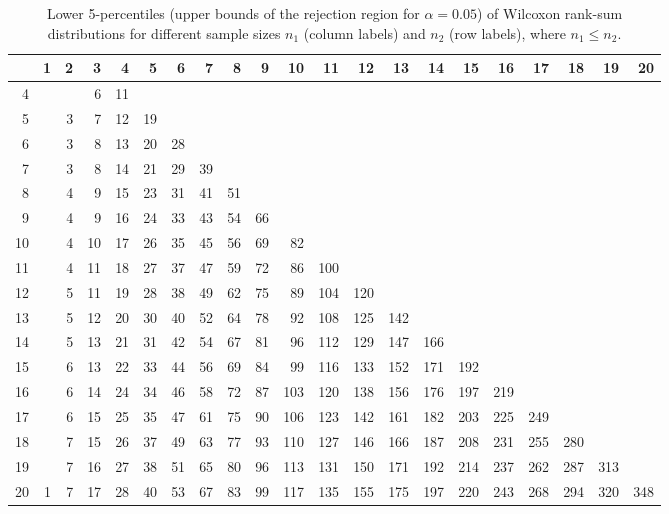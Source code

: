 \begin{table}[ht]
\centering
\begin{tabular}{@{}r@{~~}r@{~~}r@{~~}r@{~~}r@{~~}r@{~~}r@{~~}r@{~~}r@{~~}r@{~~}r@{~~}r@{~~}r@{~~}r@{~~}r@{~~}r@{~~}r@{~~}r@{~~}r@{~~}r@{~~}r@{}}
  \hline
 & 1 & 2 & 3 & 4 & 5 & 6 & 7 & 8 & 9 & 10 & 11 & 12 & 13 & 14 & 15 & 16 & 17 & 18 & 19 & 20 \\ 
  \hline
  4 &  &  & 6 & 11 &  &  &  &  &  &  &  &  &  &  &  &  &  &  &  &  \\ 
  5 &  & 3 & 7 & 12 & 19 &  &  &  &  &  &  &  &  &  &  &  &  &  &  &  \\ 
  6 &  & 3 & 8 & 13 & 20 & 28 &  &  &  &  &  &  &  &  &  &  &  &  &  &  \\ 
  7 &  & 3 & 8 & 14 & 21 & 29 & 39 &  &  &  &  &  &  &  &  &  &  &  &  &  \\ 
  8 &  & 4 & 9 & 15 & 23 & 31 & 41 & 51 &  &  &  &  &  &  &  &  &  &  &  &  \\ 
  9 &  & 4 & 9 & 16 & 24 & 33 & 43 & 54 & 66 &  &  &  &  &  &  &  &  &  &  &  \\ 
  10 &  & 4 & 10 & 17 & 26 & 35 & 45 & 56 & 69 & 82 &  &  &  &  &  &  &  &  &  &  \\ 
  11 &  & 4 & 11 & 18 & 27 & 37 & 47 & 59 & 72 & 86 & 100 &  &  &  &  &  &  &  &  &  \\ 
  12 &  & 5 & 11 & 19 & 28 & 38 & 49 & 62 & 75 & 89 & 104 & 120 &  &  &  &  &  &  &  &  \\ 
  13 &  & 5 & 12 & 20 & 30 & 40 & 52 & 64 & 78 & 92 & 108 & 125 & 142 &  &  &  &  &  &  &  \\ 
  14 &  & 5 & 13 & 21 & 31 & 42 & 54 & 67 & 81 & 96 & 112 & 129 & 147 & 166 &  &  &  &  &  &  \\ 
  15 &  & 6 & 13 & 22 & 33 & 44 & 56 & 69 & 84 & 99 & 116 & 133 & 152 & 171 & 192 &  &  &  &  &  \\ 
  16 &  & 6 & 14 & 24 & 34 & 46 & 58 & 72 & 87 & 103 & 120 & 138 & 156 & 176 & 197 & 219 &  &  &  &  \\ 
  17 &  & 6 & 15 & 25 & 35 & 47 & 61 & 75 & 90 & 106 & 123 & 142 & 161 & 182 & 203 & 225 & 249 &  &  &  \\ 
  18 &  & 7 & 15 & 26 & 37 & 49 & 63 & 77 & 93 & 110 & 127 & 146 & 166 & 187 & 208 & 231 & 255 & 280 &  &  \\ 
  19 &  & 7 & 16 & 27 & 38 & 51 & 65 & 80 & 96 & 113 & 131 & 150 & 171 & 192 & 214 & 237 & 262 & 287 & 313 &  \\ 
  20 & 1 & 7 & 17 & 28 & 40 & 53 & 67 & 83 & 99 & 117 & 135 & 155 & 175 & 197 & 220 & 243 & 268 & 294 & 320 & 348 \\ 
   \hline
\end{tabular}
\caption{Lower 5-percentiles (upper bounds of the rejection region for $\alpha=0.05$) of Wilcoxon rank-sum distributions for different sample sizes $n_1$ (column labels) and $n_2$ (row labels), where ${n_1}\leq{n_2}$.}
\label{tab:w0.05}
\label{tab:wilcox}
\end{table}
